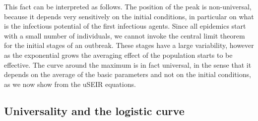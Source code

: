 \documentclass[10pt,letterpaper]{article}
\begin{document}
  This fact can be interpreted as follows. The position of the peak is non-universal, because it depends very sensitively on the initial conditions, in particular on what is the infectious potential of the first infectious agents. Since all epidemics start with a small number of individuals, we cannot invoke the central limit theorem for the initial stages of an outbreak. These stages have a large variability, however as the exponential grows the averaging effect of the population starts to be effective. The curve around the maximum is in fact universal, in the sense that it depends on the average of the basic parameters and not on the initial conditions, as we now show from the uSEIR equations.

  \subsection*{Universality and the logistic curve}
\end{document}
